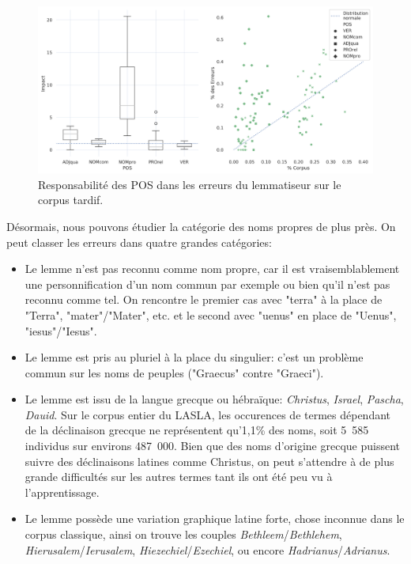 \begin{figure}
    \centering
    \includegraphics[width=1\linewidth]{results/lemmatisation/extensibilite/LatinTardifPosErrorBoxPlot.png}
    \caption{Responsabilité des POS dans les erreurs du lemmatiseur sur le corpus tardif.}
    \label{fig:latin_tardif_error_pos}
\end{figure}

Désormais, nous pouvons étudier la catégorie des noms propres de plus près. On peut classer les erreurs dans quatre grandes catégories:
\begin{itemize}
    \item Le lemme n'est pas reconnu comme nom propre, car il est vraisemblablement une personnification d'un nom commun par exemple ou bien qu'il n'est pas reconnu comme tel. On rencontre le premier cas avec "terra" à la place de "Terra", "mater"/"Mater", etc. et le second avec "uenus" en place de "Uenus", "iesus"/"Iesus".
    \item Le lemme est pris au pluriel à la place du singulier: c'est un problème commun sur les noms de peuples ("Graecus" contre "Graeci").
    \item Le lemme est issu de la langue grecque ou hébraïque: \textit{Christus}, \textit{Israel}, \textit{Pascha}, \textit{Dauid}. Sur le corpus entier du LASLA, les occurences de termes dépendant de la déclinaison grecque ne représentent qu'1,1\% des noms, soit 5~585 individus sur environs 487~000. Bien que des noms d'origine grecque puissent suivre des déclinaisons latines comme Christus, on peut s'attendre à de plus grande difficultés sur les autres termes tant ils ont été peu vu à l'apprentissage.
    \item Le lemme possède une variation graphique latine forte, chose inconnue dans le corpus classique, ainsi on trouve les couples \textit{Bethleem}/\textit{Bethlehem}, \textit{Hierusalem}/\textit{Ierusalem}, \textit{Hiezechiel}/\textit{Ezechiel}, ou encore \textit{Hadrianus}/\textit{Adrianus}.
\end{itemize}

